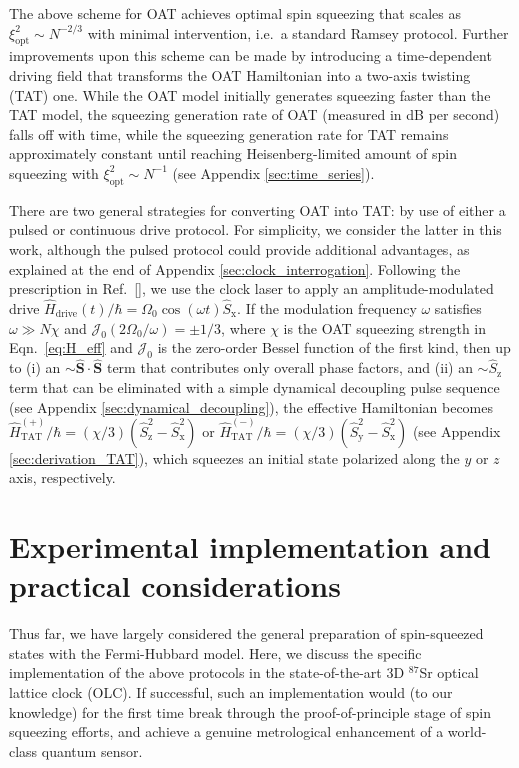 \documentclass[aps,prx,superscriptaddress,notitlepage,twocolumn,longbibliography]{revtex4-2}
\renewcommand{\t}{\text} %
\newcommand{\p}[1]{\left(#1\right)} %
\renewcommand{\c}{\cdot} %
\renewcommand{\v}{\bm} %
\newcommand{\J}{\mathcal{J}}
\newcommand{\z}{\text{z}}
\newcommand{\x}{\text{x}}
\newcommand{\y}{\text{y}}
\begin{document}
The above scheme for OAT achieves optimal spin squeezing that scales as $\xi^2_{\t{opt}}\sim N^{-2/3}$ with minimal intervention, i.e.~a standard Ramsey protocol.
Further improvements upon this scheme can be made by introducing a time-dependent driving field that transforms the OAT Hamiltonian into a two-axis twisting (TAT) one.
While the OAT model initially generates squeezing faster than the TAT model, the squeezing generation rate of OAT (measured in dB per second) falls off with time, while the squeezing generation rate for TAT remains approximately constant until reaching Heisenberg-limited amount of spin squeezing with $\xi^2_{\t{opt}}\sim N^{-1}$ (see Appendix \ref{sec:time_series})\cite{kitagawa1993squeezed}.

There are two general strategies for converting OAT into TAT: by use of either a pulsed\cite{liu2011spin} or continuous\cite{huang2015twoaxis} drive protocol.
For simplicity, we consider the latter in this  work, although the pulsed protocol could provide additional advantages, as explained at the end of Appendix \ref{sec:clock_interrogation}.
Following the prescription in Ref.~[], we use the clock laser to apply an amplitude-modulated drive $\hat H_{\t{drive}}(t)/\hbar=\Omega_0\cos(\omega t)\hat{S}_\x$.
If the modulation frequency $\omega$ satisfies $\omega\gg N\chi$ and $\J_0\p{2\Omega_0/\omega}=\pm1/3$, where $\chi$ is the OAT squeezing strength in Eqn.~\eqref{eq:H_eff} and $\J_0$ is the zero-order Bessel function of the first kind, then up to (i) an $\sim\hat{\v S}\c\hat{\v S}$ term that contributes only overall phase factors, and (ii) an $\sim\hat S_\z$ term that can be eliminated with a simple dynamical decoupling pulse sequence (see Appendix \ref{sec:dynamical_decoupling}), the effective Hamiltonian becomes $\hat H_{\t{TAT}}^{(+)}/\hbar = (\chi/3)(\hat S_\z^2-\hat S_\x^2)$ or $\hat H_{\t{TAT}}^{(-)}/\hbar = (\chi/3)(\hat S_\y^2-\hat S_\x^2)$ (see Appendix \ref{sec:derivation_TAT}), which squeezes an initial state polarized along the $y$ or $z$ axis, respectively.

\section{Experimental implementation and practical considerations}

Thus far, we have largely considered the general preparation of spin-squeezed states with the Fermi-Hubbard model.
Here, we discuss the specific implementation of the above protocols in the state-of-the-art 3D $^{87}$Sr optical lattice clock (OLC).
If successful, such an implementation would (to our knowledge) for the first time break through the proof-of-principle stage of spin squeezing efforts, and achieve a genuine metrological enhancement of a world-class quantum sensor.
\end{document}

